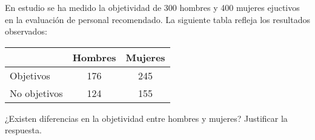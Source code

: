 
{En estudio se ha medido la objetividad de 300 hombres y 400 mujeres ejuctivos en la evaluación de personal recomendado. La siguiente tabla refleja los resultados observados:
\begin{center}
\begin{tabular}{|l|cc|}
\cline{2-3}
\multicolumn{1}{c|}{} & Hombres & Mujeres \\
\hline
Objetivos & 176 & 245\\
No objetivos & 124 & 155\\
\hline  
\end{tabular}
\end{center}
¿Existen diferencias en la objetividad entre hombres y mujeres?
Justificar la respuesta.
}